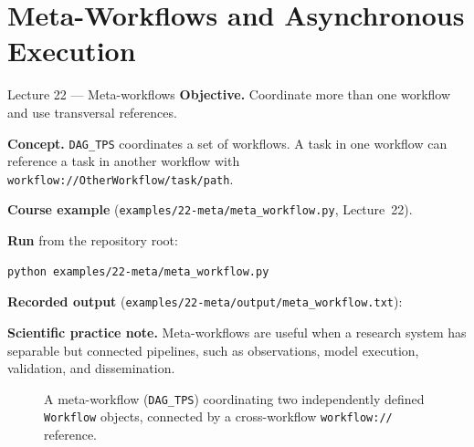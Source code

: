\chapter{Meta-Workflows and Asynchronous Execution}
\label{ch:meta-async}

\begin{lessonbox}{Lecture 22 --- Meta-workflows}
\textbf{Objective.} Coordinate more than one workflow and use transversal
references.

\textbf{Concept.} \texttt{DAG\_TPS} coordinates a set of workflows. A task in
one workflow can reference a task in another workflow with
\texttt{workflow://OtherWorkflow/task/path}.

\textbf{Course example} (\texttt{examples/22-meta/meta\_workflow.py}, Lecture~22).


\textbf{Run} from the repository root:
\begin{lstlisting}[style=bash]
python examples/22-meta/meta_workflow.py
\end{lstlisting}

\textbf{Recorded output} (\texttt{examples/22-meta/output/meta\_workflow.txt}):


\textbf{Scientific practice note.} Meta-workflows are useful when a research
system has separable but connected pipelines, such as observations, model
execution, validation, and dissemination.
\end{lessonbox}

\begin{figure}[h]
\centering
{}
\caption{A meta-workflow (\texttt{DAG\_TPS}) coordinating two independently
defined \texttt{Workflow} objects, connected by a cross-workflow
\texttt{workflow://} reference.}
\label{fig:meta-workflow}
\end{figure}

